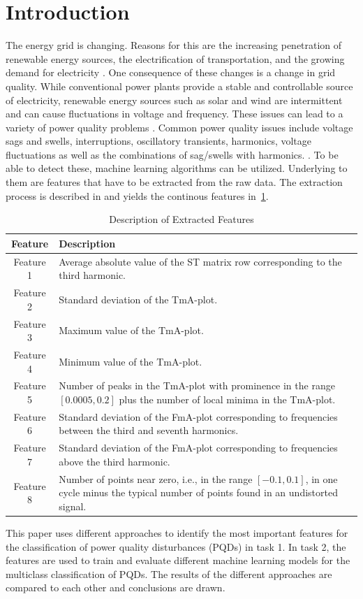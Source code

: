 \section{Introduction}
The energy grid is changing. Reasons for this are the increasing penetration of renewable energy sources, the electrification of transportation, and the growing demand for electricity \cite{emmanuelGlobalEnergyDemand2026}. One consequence of these changes is a change in grid quality. While conventional power plants provide a stable and controllable source of electricity, renewable energy sources such as solar and wind are intermittent and can cause fluctuations in voltage and frequency. These issues can lead to a variety of power quality problems \cite{kaurHarmonicDistortionPower2025}. Common power quality issues include voltage sags and swells, interruptions, oscillatory transients, harmonics, voltage fluctuations as well as the combinations of sag/swells with harmonics. \cite{igualQuantificationFeatureImportance2020}. To be able to detect these, machine learning algorithms can be utilized. Underlying to them are features that have to be extracted from the raw data. The extraction process is described in \cite{igualQuantificationFeatureImportance2020} and yields the continous features in~\ref{tab:extracted_features}.


\begin{table}[htbp]
\caption{Description of Extracted Features}
\label{tab:extracted_features}
\centering
\begin{tabularx}{\columnwidth}{c>{\raggedright\arraybackslash}X}
\hline
\hline
\textbf{Feature} & \textbf{Description} \\
\hline
Feature 1 & Average absolute value of the ST matrix row corresponding to the third harmonic. \\
Feature 2 & Standard deviation of the TmA-plot. \\
Feature 3 & Maximum value of the TmA-plot. \\
Feature 4 & Minimum value of the TmA-plot. \\
Feature 5 & Number of peaks in the TmA-plot with prominence in the range $[0.0005, 0.2]$ plus the number of local minima in the TmA-plot. \\
Feature 6 & Standard deviation of the FmA-plot corresponding to frequencies between the third and seventh harmonics. \\
Feature 7 & Standard deviation of the FmA-plot corresponding to frequencies above the third harmonic. \\
Feature 8 & Number of points near zero, i.e., in the range $[-0.1, 0.1]$, in one cycle minus the typical number of points found in an undistorted signal. \\
\hline
\hline
\end{tabularx}
\end{table}

This paper uses different approaches to identify the most important features for the classification of power quality disturbances (PQDs) in task 1. In task 2, the features are used to train and evaluate different machine learning models for the multiclass classification of PQDs. The results of the different approaches are compared to each other and conclusions are drawn.